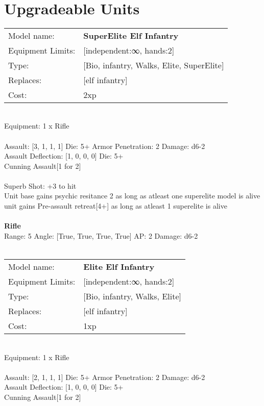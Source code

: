 
\ \\













\section{Upgradeable Units}\noindent
\begin{tabular}{ll}
Model name: &{\bf SuperElite Elf Infantry } \\
Equipment Limits: &[independent:∞, hands:2] \\
Type: &[Bio, infantry, Walks, Elite, SuperElite] \\
Replaces: &[elf infantry] \\
Cost: & 2xp\\
\end{tabular}
\ \\
Equipment: 1 x Rifle \\
\ \\
Assault: [3, 1, 1, 1] Die: 5+ Armor Penetration: 2 Damage: d6-2 \\
Assault Deflection: [1, 0, 0, 0] Die: 5+\\
\indent Cunning Assault[1 for 2]\\ 
 
\ \\
Superb Shot: +3 to hit\\ 
Unit base gains psychic resitance 2 as long as atleast one superelite model is alive\\ 
unit gains Pre-assault retreat[4+] as long as atleast 1 superelite is alive\\ 

\ \\
{\bf Rifle } \\



Range: 5  Angle: [True, True, True, True] AP: 2 Damage: d6-2 \\




 
\ \\

\noindent
\begin{tabular}{ll}
Model name: &{\bf Elite Elf Infantry } \\
Equipment Limits: &[independent:∞, hands:2] \\
Type: &[Bio, infantry, Walks, Elite] \\
Replaces: &[elf infantry] \\
Cost: & 1xp\\
\end{tabular}
\ \\
Equipment: 1 x Rifle \\
\ \\
Assault: [2, 1, 1, 1] Die: 5+ Armor Penetration: 2 Damage: d6-2 \\
Assault Deflection: [1, 0, 0, 0] Die: 5+\\
\indent Cunning Assault[1 for 2]\\ 
 
